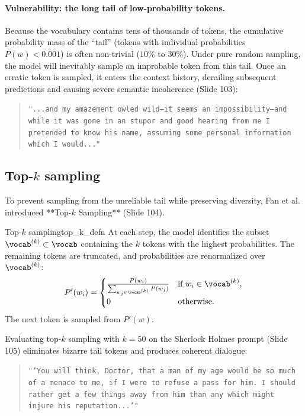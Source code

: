\documentclass[../../main.tex]{subfiles}
\begin{document}
\paragraph{Vulnerability: the long tail of low-probability tokens.}
Because the vocabulary contains tens of thousands of tokens, the cumulative probability mass of the ``tail'' (tokens with individual probabilities $P(w) < 0.001$) is often non-trivial ($10\%$ to $30\%$).
Under pure random sampling, the model will inevitably sample an improbable token from this tail. Once an erratic token is sampled, it enters the context history, derailing subsequent predictions and causing severe semantic incoherence (Slide 103):
\begin{quote}
\texttt{"...and my amazement owled wild--it seems an impossibility--and while it was gone in an stupor and good hearing from me I pretended to know his name, assuming some personal information which I would..."}
\end{quote}

\subsection{Top-$k$ sampling}
\label{subsec:top_k_sampling}

To prevent sampling from the unreliable tail while preserving diversity, Fan et al. \cite{fan2018} introduced **Top-$k$ Sampling** (Slide 104).

\begin{definition}{Top-$k$ sampling}{top_k_defn}
At each step, the model identifies the subset $\vocab^{(k)} \subset \vocab$ containing the $k$ tokens with the highest probabilities. The remaining tokens are truncated, and probabilities are renormalized over $\vocab^{(k)}$:
\begin{equation}
\label{eq:top_k_renormalization}
P'(w_i) = \begin{cases}
\frac{P(w_i)}{\sum_{w_j \in \vocab^{(k)}} P(w_j)} & \text{if } w_i \in \vocab^{(k)}, \\
0 & \text{otherwise}.
\end{cases}
\end{equation}
The next token is sampled from $P'(w)$.
\end{definition}

Evaluating top-$k$ sampling with $k=50$ on the Sherlock Holmes prompt (Slide 105) eliminates bizarre tail tokens and produces coherent dialogue:
\begin{quote}
\texttt{"'You will think, Doctor, that a man of my age would be so much of a menace to me, if I were to refuse a pass for him. I should rather get a few things away from him than any which might injure his reputation...'"}
\end{quote}
\end{document}
